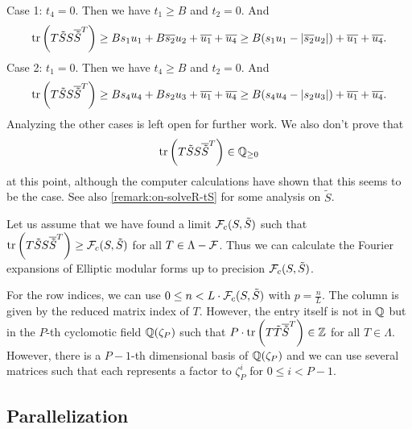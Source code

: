 Case 1: $t_4 = 0$. Then we have $t_1 \ge B$ and $t_2 = 0$. And
\[ \textup{\textrm{tr}}\left(T \tilde{S} S \overline{\tilde{S}}^T\right) \ge
 B {s_{1}} u_{1} + {B \overline{s_{2}}} u_{2} + \overline{u_{1}} + \overline{u_{4}} \ge B(s_1 u_1 - |\overline{s_2} u_2 |) + \overline{u_1} + \overline{u_4} . \]
%
Case 2: $t_1 = 0$. Then we have $t_4 \ge B$ and $t_2 = 0$. And
\[ \textup{\textrm{tr}}\left(T \tilde{S} S \overline{\tilde{S}}^T\right) \ge
 B {s_4} u_4 + {B s_{2}} u_3 + \overline{u_{1}} + \overline{u_{4}} \ge B(s_4 u_4 - |s_2 u_3 |) + \overline{u_1} + \overline{u_4} . \]
%
Analyzing the other cases is left open for further work. We also don't prove that
\[ \textup{\textrm{tr}}\left(T \tilde{S} S \overline{\tilde{S}}^T\right) \in \mathbb{Q}_{\ge 0} \]
at this point, although the computer calculations have shown that this seems to be the case. See also \cref{remark:on-solveR-tS} for some analysis on $\tilde{S}$.

Let us assume that we have found a limit $\mathcal{F}_c(S,\tilde{S})$ such that $\textup{\textrm{tr}}\left(T \tilde{S} S \overline{\tilde{S}}^T\right) \ge \mathcal{F}_c(S,\tilde{S})$ for all $T \in \Lambda - \mathcal{F}$. Thus we can calculate the Fourier expansions of Elliptic modular forms up to precision $\mathcal{F}_c(S,\tilde{S})$.
%

For the row indices, we can use $0 \le n < L \cdot \mathcal{F}_c(S,\tilde{S})$ with $p = \frac{n}{L}$. The column is given by the reduced matrix index of $T$. However, the entry itself is not in $\mathbb{Q}$ but in the $P$-th cyclomotic field $\mathbb{Q}(\zeta_P)$ such that $P \cdot \textup{\textrm{tr}}\left(T \tilde{T} \overline{\tilde{S}}^T\right) \in \mathbb{Z}$ for all $T \in \Lambda$. However, there is a $P-1$-th dimensional basis of $\mathbb{Q}(\zeta_P)$ and we can use several matrices such that each represents a factor to $\zeta_P^i$ for $0 \le i < P - 1$.


\subsection{Parallelization}
\label{impl:parallelization}

